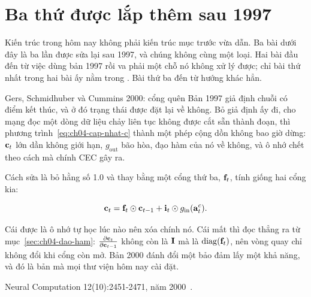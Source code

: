 \section{Ba thứ được lắp thêm sau 1997}
\label{sec:ch04-cau-noi}

%
Kiến trúc trong  hôm nay không phải kiến trúc mục trước vừa
dẫn. Ba bài dưới đây là ba lần  được sửa lại sau 1997,
và chúng không cùng một loại. Hai bài đầu đến từ việc dùng bản 1997 rồi va phải
một chỗ nó không xử lý được; chỉ bài thứ nhất trong hai bài ấy nằm trong
. Bài thứ ba đến từ hướng khác hẳn.

\begin{bridge}{Gers, Schmidhuber và Cummins 2000: cổng quên}
Bản 1997 giả định chuỗi có điểm kết thúc, và ở đó trạng thái được đặt lại về
không. Bỏ giả định ấy đi, cho mạng đọc một dòng dữ liệu chảy liên tục không
được cắt sẵn thành đoạn, thì phương trình~\eqref{eq:ch04-cap-nhat-c} thành một
phép cộng dồn không bao giờ dừng: \(\mathbf{c}_t\) lớn dần không giới hạn,
\(g_{\mathrm{out}}\) bão hòa, đạo hàm của nó về không, và ô nhớ chết theo cách
mà chính CEC gây ra.

Cách sửa là bỏ hằng số 1.0 và thay bằng một cổng thứ ba,
 \(\mathbf{f}_t\), tính giống hai cổng kia:

\[
  \mathbf{c}_t = \mathbf{f}_t \odot \mathbf{c}_{t-1}
             + \mathbf{i}_t \odot g_{\mathrm{in}}(\mathbf{a}^{c}_t).
\]

Cái được là ô nhớ tự học lúc nào nên xóa chính nó. Cái mất thì đọc thẳng ra từ
mục~\ref{sec:ch04-dao-ham}: \(\frac{\partial \mathbf{c}_t}{\partial \mathbf{c}_{t-1}}\) không còn là
\(\mathbf{I}\) mà là \(\operatorname{diag}(\mathbf{f}_t)\), nên vòng quay chỉ không đổi khi cổng
còn mở. Bản 2000 đánh đổi một bảo đảm lấy một khả năng, và đó là bản mà mọi thư
viện hôm nay cài đặt.

Neural Computation 12(10):2451-2471, năm 2000~\autocite{gers2000forget}.
\end{bridge}

